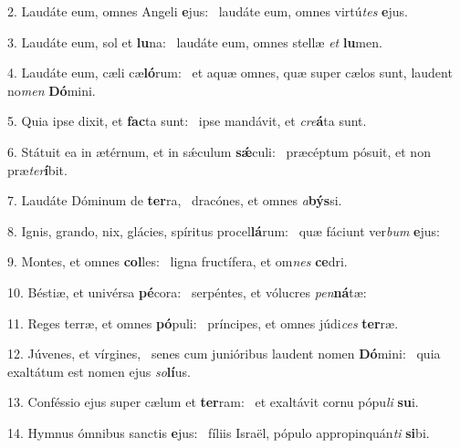 2. Laudáte eum, omnes Angeli \textbf{e}jus: \ast\  laudáte eum, omnes virtú\textit{tes} \textbf{e}jus.\

3. Laudáte eum, sol et \textbf{lu}na: \ast\  laudáte eum, omnes stellæ \textit{et} \textbf{lu}men.\

4. Laudáte eum, cæli cæ\textbf{ló}rum: \ast\  et aquæ omnes, quæ super cælos sunt, laudent no\textit{men} \textbf{Dó}mini.\

5. Quia ipse dixit, et \textbf{fac}ta sunt: \ast\  ipse mandávit, et \textit{cre}\textbf{á}ta sunt.\

6. Státuit ea in ætérnum, et in sǽculum \textbf{sǽ}culi: \ast\  præcéptum pósuit, et non præ\textit{ter}\textbf{í}bit.\

7. Laudáte Dóminum de \textbf{ter}ra, \ast\  dracónes, et omnes \textit{a}\textbf{býs}si.\

8. Ignis, grando, nix, glácies, spíritus procel\textbf{lá}rum: \ast\  quæ fáciunt ver\textit{bum} \textbf{e}jus:\

9. Montes, et omnes \textbf{col}les: \ast\  ligna fructífera, et om\textit{nes} \textbf{ce}dri.\

10. Béstiæ, et univérsa \textbf{pé}cora: \ast\  serpéntes, et vólucres \textit{pen}\textbf{ná}tæ:\

11. Reges terræ, et omnes \textbf{pó}puli: \ast\  príncipes, et omnes júdi\textit{ces} \textbf{ter}ræ.\

12. Júvenes, et vírgines, \dag\  senes cum junióribus laudent nomen \textbf{Dó}mini: \ast\  quia exaltátum est nomen ejus \textit{so}\textbf{lí}us.\

13. Conféssio ejus super cælum et \textbf{ter}ram: \ast\  et exaltávit cornu pópu\textit{li} \textbf{su}i.\

14. Hymnus ómnibus sanctis \textbf{e}jus: \ast\  fíliis Israël, pópulo appropinquán\textit{ti} \textbf{si}bi.\

